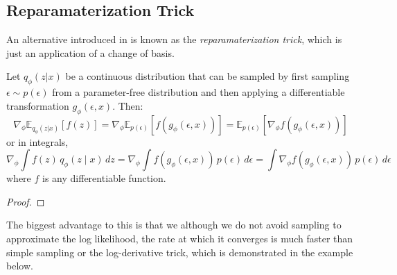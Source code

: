 \subsection{Reparamaterization Trick} 

  An alternative introduced in \cite{vae} is known as the \textit{reparamaterization trick}, which is just an application of a change of basis. 

  \begin{theorem}
    Let $q_\phi(z|x)$ be a continuous distribution that can be sampled by first sampling $\epsilon \sim p(\epsilon)$ from a parameter-free distribution and then applying a differentiable transformation $g_\phi(\epsilon, x)$. Then:
    \begin{equation}
       \nabla_\phi \mathbb{E}_{q_\phi(z|x)} [f(z)] = \nabla_\phi \mathbb{E}_{p(\epsilon)} [f(g_\phi(\epsilon, x))] = \mathbb{E}_{p(\epsilon)} [\nabla_\phi f(g_\phi(\epsilon, x))] 
     \end{equation}
    or in integrals, 
    \begin{equation}
     \nabla_\phi \int f(z) \, q_\phi (z \mid x) \,dz = \nabla_\phi \int f(g_\phi (\epsilon, x)) \, p(\epsilon) \,d\epsilon = \int \nabla_\phi f(g_\phi (\epsilon, x)) \, p(\epsilon) \, d\epsilon 
    \end{equation}
    where $f$ is any differentiable function. 
  \end{theorem}
  \begin{proof}
    
  \end{proof}

  The biggest advantage to this is that we although we do not avoid sampling to approximate the log likelihood, the rate at which it converges is much faster than simple sampling or the log-derivative trick, which is demonstrated in the example below. 

